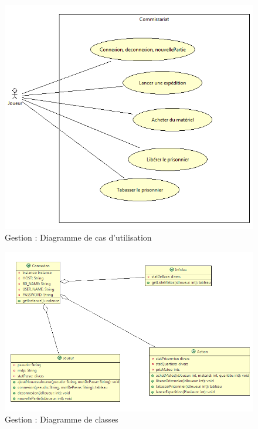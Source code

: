 \begin{figure}[h]
 \centering
 \includegraphics[width=\textwidth]{../umls/UML_images/Commissariat/utilisation} \hfill
 \caption{Gestion : Diagramme de cas d'utilisation}
\end{figure}

\begin{figure}[h]
 \centering
 \includegraphics[width=\textwidth]{../umls/UML_images/Commissariat/class} \hfill
 \caption{Gestion : Diagramme de classes}
\end{figure}
